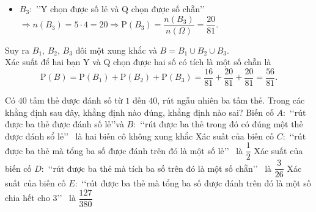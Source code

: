 \begin{ex}
{\begin{itemchoice}
\begin{itemize}
    \item $B_3\colon$ \rq\rq Y chọn được số lẻ và Q chọn được số chẵn\rq\rq~ $\Rightarrow n\left(B_3 \right)=5\cdot  4=20 \Rightarrow \mathrm{P}\left(B_3 \right)=\dfrac{n\left(B_3 \right)}{n\left(\Omega \right)}=\dfrac{20}{81}$.
   \end{itemize}
   Suy ra $B_1,\,B_2,\,B_3$ đôi một xung khắc và $B=B_1\cup B_2\cup B_3$.\\ 
   Xác suất để hai bạn Y và Q chọn được hai số có tích là một  số chẵn là
    $$\mathrm{P}(B)=\mathrm{P}(B_1)+\mathrm{P}(B_2)+\mathrm{P}(B_3)=\dfrac{16}{81}+\dfrac{20}{81}+\dfrac{20}{81}=\dfrac{56}{81}.$$
  \end{itemchoice}
 } 
\end{ex}

\begin{ex}%
  Có $40$ tấm thẻ được đánh số từ $1$ đến $40$, rút ngẫu nhiên ba tấm thẻ. Trong các khẳng định sau đây, khẳng định nào đúng, khẳng định nào sai?
  \choiceTF
  {Biến cố $A\colon$ \lq\lq rút được ba thẻ được đánh số lẻ\rq\rq và $B\colon$ \lq\lq rút được ba thẻ trong đó có đúng một thẻ được đánh sổ  lẻ\rq\rq~ là hai biến cô không xung khắc}
  {\True Xác suất của  biến cố $C\colon$ \lq\lq rút được ba thẻ mà tổng ba số được đánh trên đó là một số lẻ\rq\rq~ là $\dfrac{1}{2}$}
  {Xác suất của  biến cố $D\colon$ \lq\lq rút được ba thẻ mà tích ba số trên đó là một số chẵn\rq\rq~ là $\dfrac{3}{26}$}
  {\True Xác suất của biến cố $E\colon$ \lq\lq rút được ba thẻ mà tổng ba số được đánh  trên đó là một số chia hết cho $3$\rq\rq~ là $\dfrac{127}{380}$}
\end{ex}
